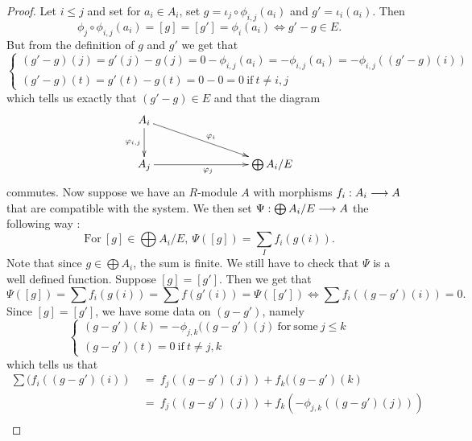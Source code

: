 \documentclass[11pt, a4paper, twoside]{article}
\begin{document}
\begin{proof}
Let $i\leq j$ and set for $a_i\in A_i$, set $g=\iota_j\circ\phi_{i,j}(a_i)$ and $g'=\iota_i(a_i)$. Then 
\begin{displaymath}
\phi_j\circ\phi_{i,j}(a_i)=[g]=[g']=\phi_i(a_i)\Leftrightarrow g'-g\in E.
\end{displaymath}
But from the definition of $g$ and $g'$ we get that
\begin{displaymath}
\begin{cases}
    (g'-g)(j)=g'(j)-g(j)=0-\phi_{i,j}(a_i)=-\phi_{i,j}(a_i)=-\phi_{i,j}((g'-g)(i))\\
    (g'-g)(t)=g'(t)-g(t)=0-0=0\ \mathrm{if}\ t\neq i,j
\end{cases}
\end{displaymath}
which tells us exactly that $(g'-g)\in E$ and that the diagram 
\begin{displaymath}
    \xymatrix{
    A_i\ar[d]_{\phi_{i,j}}\ar[rrrd]^{\phi_i}\\
    A_j\ar[rrr]_{\phi_j} & & &  \bigoplus A_i/E\\
    }
\end{displaymath}
commutes. Now suppose we have an $R$-module $A$ with morphisms $f_i:A_i\longrightarrow A$ that are compatible with the system. We then set $\Psi:\bigoplus A_i/E\longrightarrow A$ the following way :
\begin{displaymath}
    \mathrm{For}\ [g]\in\bigoplus A_i/E,\ \Psi([g])=\sum_If_i(g(i)).
\end{displaymath}
Note that since $g\in\bigoplus A_i$, the sum is finite. We still have to check that $\Psi$ is a well defined function. Suppose $[g]=[g']$. Then we get that
\begin{displaymath}
    \Psi([g])=\sum f_i(g(i))=\sum f(g'(i))=\Psi([g'])\Leftrightarrow\sum f_i((g-g')(i))=0.
\end{displaymath}
Since $[g]=[g']$, we have some data on $(g-g')$, namely
\begin{displaymath}
\begin{cases}
    (g-g')(k)=-\phi_{j,k}((g-g')(j)\ \mathrm{for\ some}\ j\leq k\\
    (g-g')(t)=0\ \mathrm{if}\ t\neq j,k
\end{cases}
\end{displaymath}
which tells us that 
\begin{align*}
    \sum\limits(f_i((g-g')(i))\ &=\ f_j((g-g')(j))+f_k((g-g')(k)\\
    &=\ f_j((g-g')(j))+f_k(-\phi_{j,k}((g-g')(j)))\\

\end{align*}
\end{proof}
\end{document}
